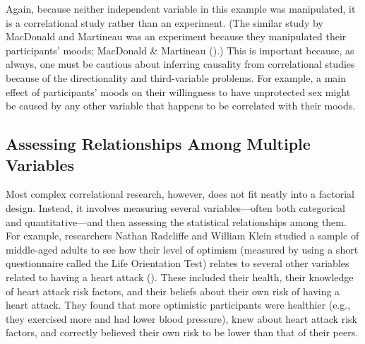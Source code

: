 \documentclass[
]{krantz}
\begin{document}
Again, because neither independent variable in this example was manipulated, it is a correlational study rather than an experiment. (The similar study by MacDonald and Martineau was an experiment because they manipulated their participants' moods; MacDonald \& Martineau ().) This is important because, as always, one must be cautious about inferring causality from correlational studies because of the directionality and third-variable problems. For example, a main effect of participants' moods on their willingness to have unprotected sex might be caused by any other variable that happens to be correlated with their moods.

\subsection*{Assessing Relationships Among Multiple Variables}\label{assessing-relationships-among-multiple-variables}


Most complex correlational research, however, does not fit neatly into a factorial design. Instead, it involves measuring several variables---often both categorical and quantitative---and then assessing the statistical relationships among them. For example, researchers Nathan Radcliffe and William Klein studied a sample of middle-aged adults to see how their level of optimism (measured by using a short questionnaire called the Life Orientation Test) relates to several other variables related to having a heart attack (). These included their health, their knowledge of heart attack risk factors, and their beliefs about their own risk of having a heart attack. They found that more optimistic participants were healthier (e.g., they exercised more and had lower blood pressure), knew about heart attack risk factors, and correctly believed their own risk to be lower than that of their peers.
\end{document}
